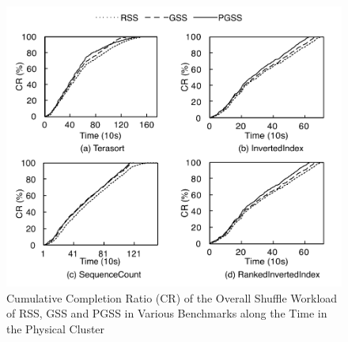 \documentclass[10pt,journal,compsoc]{IEEEtran}
\begin{document}




\begin{figure}
\centering
\includegraphics[width=1\columnwidth]{figure5}
\caption{Cumulative Completion Ratio (CR) of the Overall Shuffle Workload of RSS, GSS and PGSS in Various Benchmarks along the Time
in the Physical Cluster} 
\label{fig:new_completion_ratio}
\end{figure}
\end{document}
